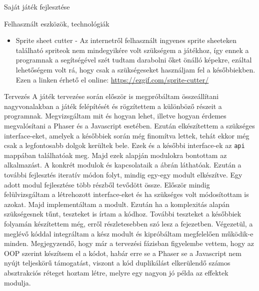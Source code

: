 \begin{MyChapter}{Saját játék fejlesztése}
\begin{MySection}{Felhasznált eszközök, technológiák}
\begin{itemize}
			\item Sprite sheet cutter - Az internetről felhasznált ingyenes sprite sheeteken található spriteok nem mindegyikére volt szükségem a játékhoz, így ennek a programnak a segítségével szét tudtam darabolni őket önálló képekre, ezáltal lehetőségem volt rá, hogy csak a szükségeseket használjam fel a későbbiekben. Ezen a linken érhető el online: \url{https://ezgif.com/sprite-cutter/}
			
		\end{itemize}
	
	\end{MySection}
		
	\begin{MySection}{Tervezés}
		A játék tervezése során először is megpróbáltam összeállítani nagyvonalakban a játék felépítését és rögzítettem a különböző részeit a programnak. Megvizsgáltam mit és hogyan lehet, illetve hogyan érdemes megvalósítani a Phaser és a Javascript esetében.
		Ezután elkészítettem a szükséges interface-eket, amelyek a későbbiek során még finomítva lettek, tehát ekkor még csak a legfontosabb dolgok kerültek bele. Ezek és a későbbi interface-ek az \texttt{api} mappában találhatóak meg. Majd ezek alapján modulokra bontottam az alkalmazást. A konkrét modulok és kapcsolataik a  ábrán láthatóak. Ezután a további fejlesztés iteratív módon folyt, mindig egy-egy modult elkészítve. Egy adott modul fejlesztése több részből tevődött össze. Először mindig felülvizsgáltam a létrehozott interface-eket és ha szükséges volt módosítottam is azokat. Majd implementáltam a modult. Ezután ha a komplexitás alapán szükségesnek tűnt, teszteket is írtam a kódhoz. További teszteket a későbbiek folyamán készítettem még, erről részletesebben szó lesz a  fejezetben. Végezetül, a meglévő kóddal integráltam a kész modult és kipróbáltam megfelelően működik-e minden. Megjegyzendő, hogy már a tervezési fázisban figyelembe vettem, hogy az OOP szerint készítsem el a kódot, habár erre se a Phaser se a Javascript nem nyújt teljeskörű támogatást, viszont a kód duplikálást elkerülendő számos absztrakciós réteget hoztam létre, melyre egy nagyon jó példa az effektek modulja.
		

\end{MySection}
\end{MyChapter}
